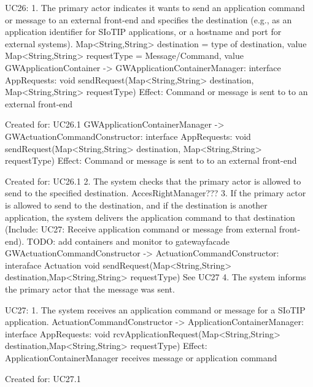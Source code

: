         UC26:
            1. The primary actor indicates it wants to send an application command or message to an external
                front-end and specifies the destination (e.g., as an application identifier for SIoTIP applications,
                or a hostname and port for external systems).
                Map<String,String> destination = type of destination, value
                Map<String,String> requestType = Message/Command, value
                GWApplicationContainer -> GWApplicationContainerManager: interface AppRequests:
                                                   void sendRequest(Map<String,String> destination, Map<String,String> requestType)
                       Effect: Command or message is sent to  to an external front-end
                       \item Created for: UC26.1
                GWApplicationContainerManager -> GWActuationCommandConstructor: interface AppRequests:
                                                      void sendRequest(Map<String,String> destination, Map<String,String> requestType)
                         Effect: Command or message is sent to  to an external front-end
                       \item Created for: UC26.1         
            2. The system checks that the primary actor is allowed to send to the specified destination.
            AccesRightManager???
            3. If the primary actor is allowed to send to the destination, and if the destination is another
                application, the system delivers the application command to that destination (Include: UC27:
                Receive application command or message from external front-end).
                TODO: add containers and monitor to gatewayfacade
                GWActuationCommandConstructor -> ActuationCommandConstructor: interaface Actuation
                                        void sendRequest(Map<String,String> destination,Map<String,String> requestType)
                See UC27
            4. The system informs the primary actor that the message was sent.
       
       UC27:     
        1. The system receives an application command or message for a SIoTIP application.
            ActuationCommandConstructor -> ApplicationContainerManager: interface AppRequests:
                                                 void rcvApplicationRequest(Map<String,String> destination,Map<String,String> requestType)
                   Effect: ApplicationContainerManager receives message or application command
                   \item Created for: UC27.1
            
